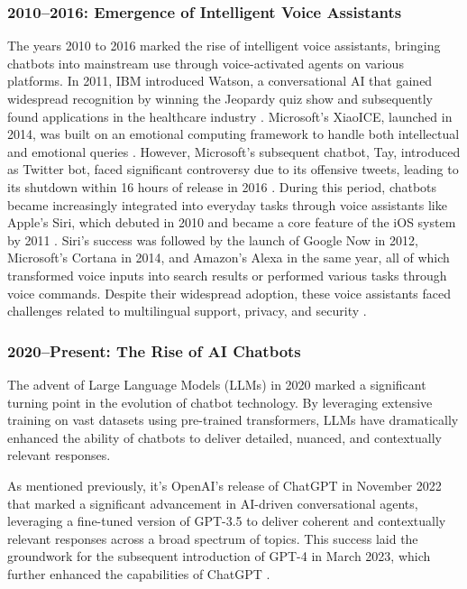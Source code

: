 \subsubsection{2010–2016: Emergence of Intelligent Voice Assistants}

The years 2010 to 2016 marked the rise of intelligent voice assistants, bringing chatbots into mainstream use through voice-activated agents on various platforms. In 2011, IBM introduced Watson, a conversational AI that gained widespread recognition by winning the Jeopardy quiz show and subsequently found applications in the healthcare industry \cite{chen2016ibm}. Microsoft's XiaoICE, launched in 2014, was built on an emotional computing framework to handle both intellectual and emotional queries \cite{zhou2020design}. However, Microsoft's subsequent chatbot, Tay, introduced as Twitter bot, faced significant controversy due to its offensive tweets, leading to its shutdown within 16 hours of release in 2016 \cite{hoy2018alexa}. During this period, chatbots became increasingly integrated into everyday tasks through voice assistants like Apple's Siri, which debuted in 2010 and became a core feature of the iOS system by 2011 \cite{aron2011innovative}. Siri's success was followed by the launch of Google Now in 2012, Microsoft's Cortana in 2014, and Amazon's Alexa in the same year, all of which transformed voice inputs into search results or performed various tasks through voice commands. Despite their widespread adoption, these voice assistants faced challenges related to multilingual support, privacy, and security \cite{bolton2021security}.

\subsubsection{2020–Present: The Rise of AI Chatbots}

The advent of Large Language Models (LLMs) in 2020 marked a significant turning point in the evolution of chatbot technology. By leveraging extensive training on vast datasets using pre-trained transformers, LLMs have dramatically enhanced the ability of chatbots to deliver detailed, nuanced, and contextually relevant responses.

As mentioned previously, it's OpenAI's release of ChatGPT in November 2022 that marked a significant advancement in AI-driven conversational agents, leveraging a fine-tuned version of GPT-3.5 to deliver coherent and contextually relevant responses across a broad spectrum of topics. This success laid the groundwork for the subsequent introduction of GPT-4 in March 2023, which further enhanced the capabilities of ChatGPT \cite{wikipedia2023chatgpt}.

